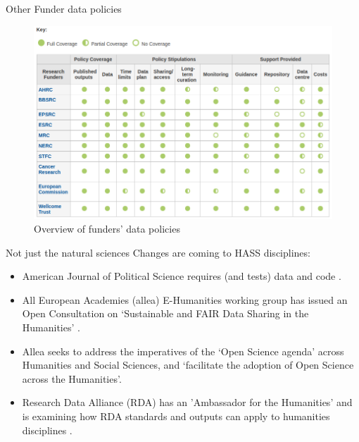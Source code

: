 \documentclass[aspectratio=169, 11pt]{beamer} %
\begin{document}
\begin{frame}{Other Funder data policies}
  \begin{figure}[H]
    \centering
        \includegraphics[height=.7\textheight]{figures/DCC-Funders.png}
        \caption{Overview of funders' data policies \cite{Dcc2019-jn}}
        \label{fig:Dcc2018}
  \end{figure}
\end{frame}

\begin{frame}{Not just the natural sciences}
  Changes are coming to HASS disciplines:
    \begin{itemize}[label=\textbullet]
        \item American Journal of Political Science requires (and tests) data and code \cite{Jacoby2017-lw, Ajps2015-ex}.
        \item All European Academies (allea) E-Humanities working group \cite{Allea2019-wy} has issued an Open Consultation on `Sustainable and FAIR Data Sharing in the Humanities' \cite{Allea2019-aw}.
        \item Allea seeks to address the imperatives of the `Open Science agenda' across Humanities and Social Sciences, and `facilitate the adoption of Open Science across the Humanities'.
        \item Research Data Alliance (RDA) has an 'Ambassador for the Humanities' and is examining how RDA standards and outputs can apply to humanities disciplines \cite{Rda2019-wc}.
    \end{itemize}
\end{frame}
\end{document}

